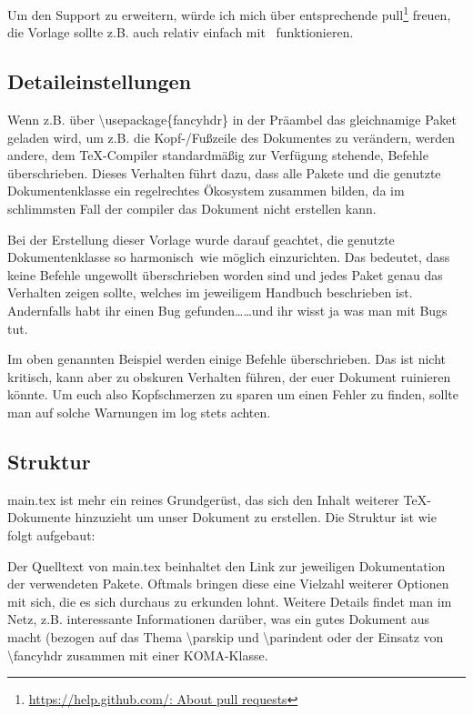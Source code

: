 Um den Support zu erweitern, würde ich mich über entsprechende \gls{pull}\footnote{\href{https://help.github.com/en/articles/about-pull-requests}{https://help.github.com/: About pull requests}} freuen, die Vorlage sollte z.B. auch relativ einfach mit \ funktionieren.%
\subsection{Detaileinstellungen}%
\label{detail-grundl}
Wenn z.B. über \textbackslash usepackage\{fancyhdr\} in der Präambel das gleichnamige Paket geladen wird, um z.B. die Kopf-/Fußzeile des Dokumentes zu verändern, werden andere, dem \TeX{}-Compiler standardmäßig zur Verfügung stehende, Befehle überschrieben. Dieses Verhalten führt dazu, dass alle Pakete und die genutzte Dokumentenklasse ein regelrechtes Ökosystem zusammen bilden, da im schlimmsten Fall der \gls{compiler} das Dokument nicht erstellen kann.

Bei der Erstellung dieser Vorlage wurde darauf geachtet, die genutzte Dokumentenklasse so \glqq harmonisch\grqq\ wie möglich einzurichten. Das bedeutet, dass keine Befehle ungewollt überschrieben worden sind und jedes Paket genau das Verhalten zeigen sollte, welches im jeweiligem Handbuch beschrieben ist. Andernfalls habt ihr einen Bug gefunden\dots \dots und ihr wisst ja was man mit Bugs tut.

Im oben genannten Beispiel werden einige Befehle überschrieben. Das ist nicht kritisch, kann aber zu obskuren Verhalten führen, der euer Dokument ruinieren könnte. Um euch also Kopfschmerzen zu sparen um einen Fehler zu finden, sollte man auf solche Warnungen im log stets achten.%
\subsection{Struktur}%
main.tex ist mehr ein reines Grundgerüst, das sich den Inhalt weiterer \TeX{}-Dokumente hinzuzieht um unser Dokument zu erstellen. Die Struktur ist wie folgt aufgebaut:



Der Quelltext von main.tex beinhaltet den Link zur jeweiligen Dokumentation der verwendeten Pakete. Oftmals bringen diese eine Vielzahl weiterer Optionen mit sich, die es sich durchaus zu erkunden lohnt.
Weitere Details findet man im Netz, z.B.  interessante Informationen darüber, was ein gutes Dokument aus macht (bezogen auf das Thema \textbackslash parskip und \textbackslash parindent oder der Einsatz von \textbackslash fancyhdr zusammen mit einer KOMA-Klasse.%
